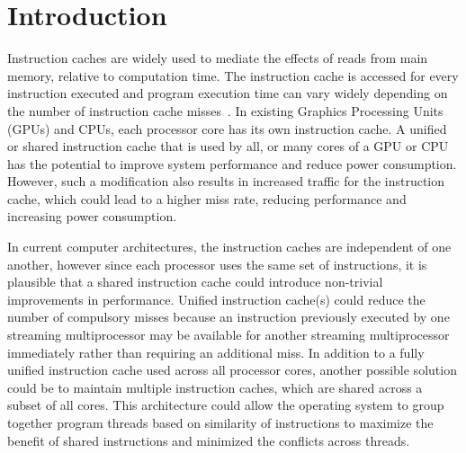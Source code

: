 \section{Introduction}


Instruction caches are widely used to mediate the effects of reads
from main memory, relative to computation time. 
The instruction cache is accessed for every instruction executed and
program execution time can vary widely depending on the number of
instruction cache misses~\cite{arnold94}. 
In existing Graphics Processing Units (GPUs) and CPUs, each processor
core has its own instruction cache. 
A unified or shared instruction cache that is used by all, or many
cores of a GPU or CPU has the potential to improve system performance
and reduce power consumption.
However, such a modification also results in increased traffic for the
instruction cache, which could lead to a higher miss rate, reducing
performance and increasing power consumption. 

In current computer architectures, the instruction caches are
independent of one another, however since each processor uses the same
set of instructions, it is plausible that a shared instruction cache
could introduce non-trivial improvements in performance. 
Unified instruction cache(s) could reduce the number of compulsory
misses because an instruction previously executed by one streaming
multiprocessor may be available for another streaming multiprocessor
immediately rather than requiring an additional miss. 
In addition to a fully unified instruction cache used across all
processor cores, another possible solution could be to maintain
multiple instruction caches, which are shared across a subset of all
cores. 
This architecture could allow the operating system to group together
program threads based on similarity of instructions to maximize the
benefit of shared instructions and minimized the conflicts across
threads. 

